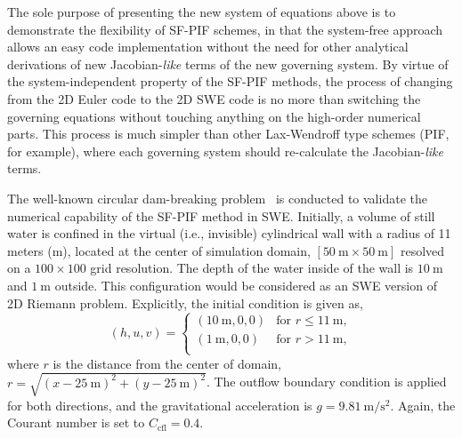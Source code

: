 The sole purpose of presenting the new system of equations above
is to demonstrate the flexibility of SF-PIF schemes,
in that the system-free approach allows an easy code implementation
without the need for other analytical derivations of new
Jacobian-\textit{like} terms of the new governing system.
By virtue of the system-independent property of the SF-PIF methods,
the process of changing from the 2D Euler code to the 2D SWE code is
no more than switching the governing equations
without touching anything on the high-order numerical parts.
This process is much simpler than other Lax-Wendroff type schemes (PIF, for example),
where each governing system should re-calculate the Jacobian-\textit{like} terms.

The well-known circular dam-breaking problem~\cite{alcrudo1993high,toro2001shock,delis2005numerical}
is conducted to validate the numerical capability of the SF-PIF method in SWE\@.
Initially, a volume of still water is confined
in the virtual (i.e., invisible) cylindrical 
wall with a radius of 11 meters (m),
located at the center of simulation domain,
\( \left[ \SI{50}{\meter} \times \SI{50}{\meter} \right] \)
resolved on a $100 \times 100$ grid resolution.
The depth of the water inside of the wall is
\( \SI{10}{\meter} \) and \( \SI{1}{\meter} \) outside.
This configuration would be considered as an
SWE version of 2D Riemann problem.
Explicitly, the initial condition is given as,
\begin{equation}\label{eq:swe-init}
    \left(h, u, v \right) = \begin{cases}
        \left(\SI{10}{\meter}, 0, 0 \right) & \text{for } r \le \SI{11}{\meter}, \\
        \left(\SI{1}{\meter}, 0, 0 \right) & \text{for } r > \SI{11}{\meter}, \\
    \end{cases}
\end{equation}
where \( r \) is the distance from the center of domain,
\( r = \sqrt{\left( x - \SI{25}{\meter} \right)^{2} + \left( y - \SI{25}{\meter} \right)^{2} } \).
The outflow boundary condition is applied for both directions,
and the gravitational acceleration is \( g = \SI{9.81}{\meter\per\square\second}\).
Again, the Courant number is set to \( C_{\text{cfl}} = 0.4 \).

